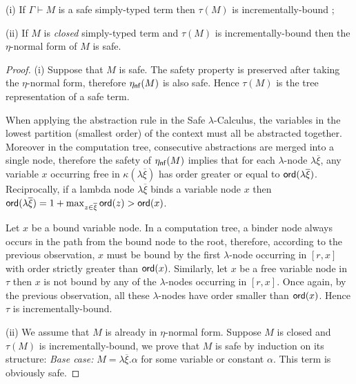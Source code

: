 \documentclass{llncs}
\newcommand\etanf[1]{\eta_{\sf nf}(#1)}
\newcommand\ord[1]{{\sf ord}(#1)}
\begin{document}
\begin{lemma}
\label{lem:safe_imp_incrbound}

(i) If $\Gamma \vdash M$ is a safe simply-typed term then $\tau(M)$ is incrementally-bound ;

(ii) If $M$ is \emph{closed} simply-typed term and $\tau(M)$ is incrementally-bound then the $\eta$-normal form of $M$ is safe.
\end{lemma}
\begin{proof}
(i) Suppose that $M$ is safe. The safety property is preserved after
taking the $\eta$-normal form, therefore $\etanf{M}$ is also safe.
Hence $\tau(M)$ is the tree representation of a safe term.

When applying the abstraction rule in the Safe $\lambda$-Calculus,
the variables in the lowest partition (smallest order) of the
context must all be abstracted together. Moreover in the computation
tree, consecutive abstractions are merged into a single node,
therefore the safety of $\etanf{M}$ implies that for each
$\lambda$-node $\lambda \overline{\xi}$, any variable $x$ occurring
free in $\kappa(\lambda \overline{\xi})$ has order greater or equal
to $\ord{\lambda \overline{\xi}}$. Reciprocally, if a lambda node
$\lambda \overline{\xi}$ binds a variable node $x$ then
$\ord{\lambda \overline{\xi}} = 1+\max_{z\in\overline{\xi}} \ord{z}
> \ord{x}$.

Let $x$ be a bound variable node. In a computation tree, a binder
node always occurs in the path from the bound node to the root,
therefore, according to the previous observation, $x$ must be bound
by the first $\lambda$-node occurring in $[r,x]$ with order strictly
greater than $\ord{x}$. Similarly, let $x$ be a free variable node
in $\tau$ then $x$ is not bound by any of the $\lambda$-nodes
occurring in $[r,x]$. Once again, by the previous observation, all
these $\lambda$-nodes have order smaller than $\ord{x}$. Hence
$\tau$ is incrementally-bound.

(ii) We assume that $M$ is already in $\eta$-normal form. Suppose
$M$ is closed and $\tau(M)$ is incrementally-bound, we prove that
$M$ is safe by induction on its structure: \emph{Base case:} $M =
\lambda \overline{\xi} . \alpha$ for some variable or constant
$\alpha$. This term is obviously safe.


\end{proof}
\end{document}

